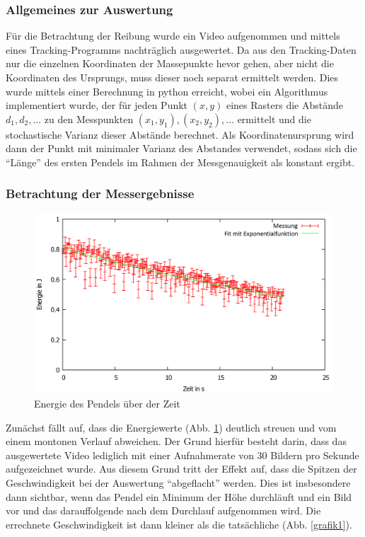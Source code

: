 \subsubsection{Allgemeines zur Auswertung}
Für die Betrachtung der Reibung wurde ein Video aufgenommen und mittels eines Tracking-Programms nachträglich ausgewertet. 
Da aus den Tracking-Daten nur die einzelnen Koordinaten der Massepunkte hevor gehen, aber nicht die Koordinaten des Ursprungs, muss dieser noch separat ermittelt werden. Dies wurde mittels einer Berechnung in python erreicht, wobei ein Algorithmus implementiert wurde, der für jeden Punkt $(x, y)$ eines Rasters die Abstände $d_1, d_2, ... $ zu den Messpunkten $(x_1, y_1), (x_2, y_2), ...$ ermittelt und die stochastische Varianz dieser Abstände berechnet. Als Koordinatenursprung wird dann der Punkt mit minimaler Varianz des Abstandes verwendet, sodass sich die \enquote{Länge} des ersten Pendels im Rahmen der Messgenauigkeit als konstant ergibt.  

\subsubsection{Betrachtung der Messergebnisse}


\begin{figure}
        \includegraphics[width=.9\textwidth]{images/E_ueber_t_neu.png}
\caption{Energie des Pendels über der Zeit}
\label{E_ueber_t}
\end{figure}

Zunächst fällt auf, dass die Energiewerte (Abb. \ref{E_ueber_t}) deutlich streuen und vom einem montonen Verlauf abweichen. Der Grund hierfür besteht darin, dass das ausgewertete Video lediglich mit einer Aufnahmerate von 30 Bildern pro Sekunde aufgezeichnet wurde. Aus diesem Grund tritt der Effekt auf, dass die Spitzen der Geschwindigkeit bei der Auswertung \enquote{abgeflacht} werden. Dies ist insbesondere dann sichtbar, wenn das Pendel ein Minimum der Höhe durchläuft und ein Bild vor und das darauffolgende nach dem Durchlauf aufgenommen wird. Die errechnete Geschwindigkeit ist dann kleiner als die tatsächliche (Abb. \ref{grafik1}). 

